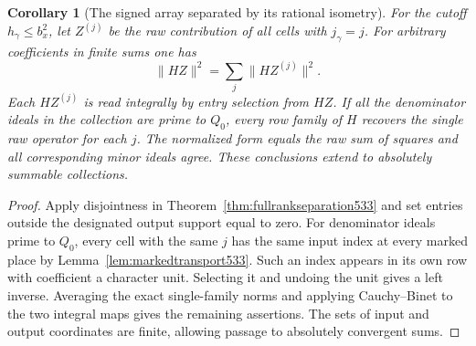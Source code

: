 \documentclass[a4paper,11pt]{article}
\newtheorem{corollary}[proposition]{Corollary}
\theoremstyle{definition}
\theoremstyle{remark}
\numberwithin{equation}{section}
\begin{document}
\begin{corollary}[The signed array separated by its rational isometry]
\leavevmode\label{cor:transportarray533}
For the cutoff \(h_\gamma\le b_x^2\), let \(Z^{(j)}\) be the
raw contribution of all cells with \(j_\gamma=j\). For arbitrary
coefficients in finite sums one has
\[
       \|HZ\|^2=\sum_j\|HZ^{(j)}\|^2 .
\]
Each \(HZ^{(j)}\) is read integrally by entry selection from
\(HZ\). If all the denominator ideals in the collection are
prime to \(Q_0\), every row family of \(H\) recovers the single
raw operator for each \(j\). The normalized form equals the
raw sum of squares and all corresponding minor ideals agree.
These conclusions extend to absolutely summable collections.
\end{corollary}
\begin{proof}
Apply disjointness in Theorem~\ref{thm:fullrankseparation533}
and set entries outside the designated output support equal
to zero. For denominator ideals prime to \(Q_0\), every cell
with the same \(j\) has the same input index at every marked
place by Lemma~\ref{lem:markedtransport533}. Such an index
appears in its own row with coefficient a character unit.
Selecting it and undoing the unit gives a left inverse.
Averaging the exact single-family norms and applying
Cauchy--Binet to the two integral maps gives the remaining
assertions. The sets of input and output coordinates are
finite, allowing passage to absolutely convergent sums.
\end{proof}
\end{document}
